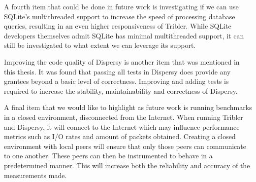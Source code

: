 A fourth item that could be done in future work is investigating if we can use SQLite's multithreaded support to increase the speed of processing database queries, resulting in an even higher responsiveness of Tribler.
While SQLite developers themselves admit SQLite has minimal multithreaded support, it can still be investigated to what extent we can leverage its support.

Improving the code quality of Dispersy is another item that was mentioned in this thesis.
It was found that passing all tests in Dispersy does provide any grantees beyond a basic level of correctness.
Improving and adding tests is required to increase the stability, maintainability and correctness of Dispersy.

A final item that we would like to highlight as future work is running benchmarks in a closed environment, disconnected from the Internet.
When running Tribler and Dispersy, it will connect to the Internet which may influence performance metrics such as I/O rates and amount of packets obtained.
Creating a closed environment with local peers will ensure that only those peers can communicate to one another.
These peers can then be instrumented to behave in a predetermined manner.
This will increase both the reliability and accuracy of the measurements made.
